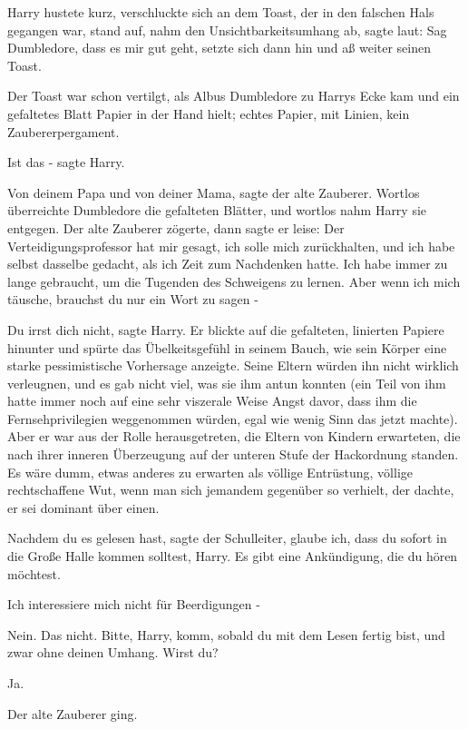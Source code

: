 Harry hustete kurz, verschluckte sich an dem Toast, der in den falschen Hals
gegangen war, stand auf, nahm den Unsichtbarkeitsumhang ab, sagte laut: \glqq{}
Sag Dumbledore, dass es mir gut geht\grqq{}, setzte sich dann hin und aß weiter
seinen Toast.

Der Toast war schon vertilgt, als Albus Dumbledore zu Harrys Ecke kam und ein
gefaltetes Blatt Papier in der Hand hielt; echtes Papier, mit Linien, kein
Zaubererpergament.

\glqq{}Ist das -\grqq{} sagte Harry.

\glqq{}Von deinem Papa und von deiner Mama\grqq{}, sagte der alte Zauberer.
Wortlos überreichte Dumbledore die gefalteten Blätter, und wortlos nahm Harry
sie entgegen. Der alte Zauberer zögerte, dann sagte er leise: \glqq{}Der
Verteidigungsprofessor hat mir gesagt, ich solle mich zurückhalten, und ich habe
selbst dasselbe gedacht, als ich Zeit zum Nachdenken hatte. Ich habe immer zu
lange gebraucht, um die Tugenden des Schweigens zu lernen. Aber wenn ich mich
täusche, brauchst du nur ein Wort zu sagen -\grqq{}

\glqq{}Du irrst dich nicht\grqq{}, sagte Harry. Er blickte auf die gefalteten,
linierten Papiere hinunter und spürte das Übelkeitsgefühl in seinem Bauch, wie
sein Körper eine starke pessimistische Vorhersage anzeigte. Seine Eltern würden
ihn nicht wirklich verleugnen, und es gab nicht viel, was sie ihm antun konnten
(ein Teil von ihm hatte immer noch auf eine sehr viszerale Weise Angst davor,
dass ihm die Fernsehprivilegien weggenommen würden, egal wie wenig Sinn das
jetzt machte). Aber er war aus der Rolle herausgetreten, die Eltern von Kindern
erwarteten, die nach ihrer inneren Überzeugung auf der unteren Stufe der
Hackordnung standen. Es wäre dumm, etwas anderes zu erwarten als völlige
Entrüstung, völlige rechtschaffene Wut, wenn man sich jemandem gegenüber so
verhielt, der dachte, er sei dominant über einen.

\glqq{}Nachdem du es gelesen hast\grqq{}, sagte der Schulleiter, \glqq{}glaube
ich, dass du sofort in die Große Halle kommen solltest, Harry. Es gibt eine
Ankündigung, die du hören möchtest.\grqq{}

\glqq{}Ich interessiere mich nicht für Beerdigungen -\grqq{}

\glqq{}Nein. Das nicht. Bitte, Harry, komm, sobald du mit dem Lesen fertig bist,
und zwar ohne deinen Umhang. Wirst du?\grqq{}

\glqq{}Ja.\grqq{}

Der alte Zauberer ging.

